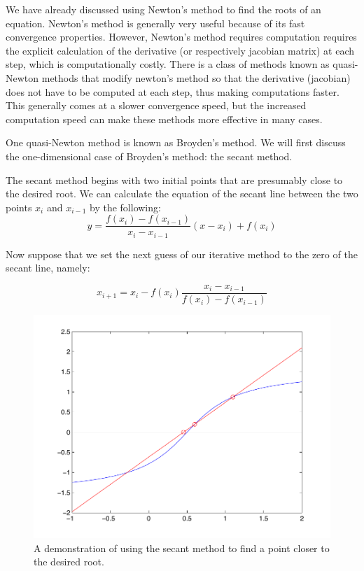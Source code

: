 

We have already discussed using Newton's method to find the roots of an equation. Newton's method is generally very useful because of its fast convergence properties. However, Newton's method requires computation requires the explicit calculation of the derivative (or respectively jacobian matrix) at each step, which is computationally costly. There is a class of methods known as quasi-Newton methods that modify newton's method so that the derivative (jacobian) does not have to be computed at each step, thus making computations faster. This generally comes at a slower convergence speed, but the increased computation speed can make these methods more effective in many cases.

One quasi-Newton method is known as Broyden's method. We will first discuss the one-dimensional case of Broyden's method: the secant method.

The secant method begins with two initial points that are presumably close to the desired root. We can calculate the equation of the secant line between the two points $x_i$ and $x_{i-1}$ by the following:
\[
y = \frac{f(x_i)-f(x_{i-1})}{x_i-x_{i-1}}(x-x_i) + f(x_i)
\]

Now suppose that we set the next guess of our iterative method to the zero of the secant line, namely:

\[
x_{i+1} = x_i - f(x_i)\frac{x_i-x_{i-1}}{f(x_i)-f(x_{i-1})}
\]

\begin{figure}\label{Fig:Secant}
\begin{center}
\includegraphics[scale = .5]{./Figures/Broyden_Secant_Method}
\caption{A demonstration of using the secant method to find a point closer to the desired root.}
\end{center}
\end{figure}

